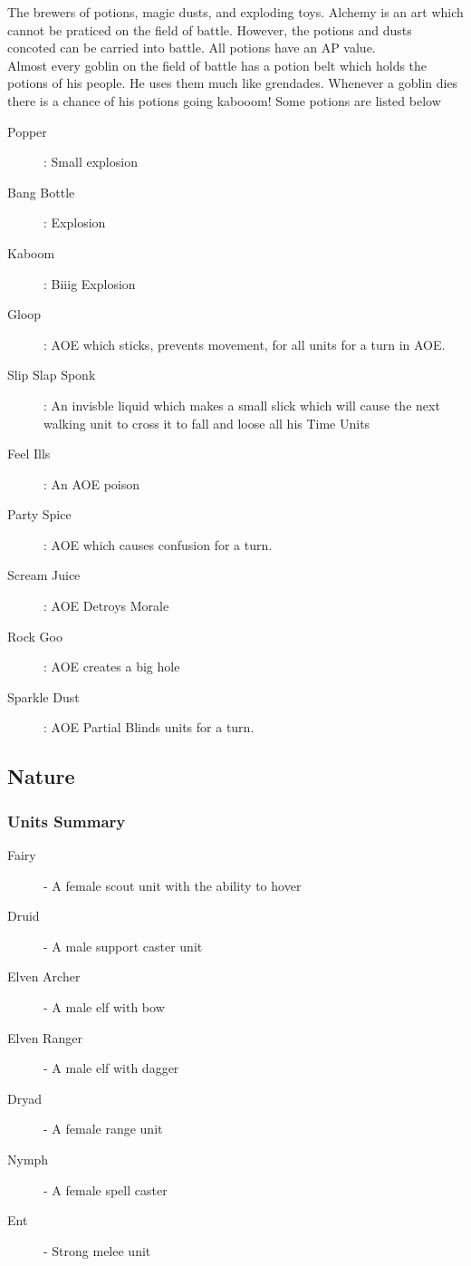 \documentclass[a4paper]{article}
\begin{document}
The brewers of potions, magic dusts, and exploding toys. Alchemy is an art which cannot be praticed on the field of battle. However, the potions and dusts concoted can be carried into battle. All potions have an AP value.\\
Almost every goblin on the field of battle has a potion belt which holds the potions of his people. He uses them much like grendades. Whenever a goblin dies there is a chance of his potions going kabooom! Some potions are listed below
\begin{description}
\item[Popper]: Small explosion
\item[Bang Bottle]: Explosion
\item[Kaboom]: Biiig Explosion
\item[Gloop]: AOE which sticks, prevents movement, for all units for a turn in AOE.
\item[Slip Slap Sponk]: An invisble liquid which makes a small slick which will cause the next walking unit to cross it to fall and loose all his Time Units
\item[Feel Ills]: An AOE poison
\item[Party Spice]: AOE which causes confusion for a turn.
\item[Scream Juice]: AOE Detroys Morale
\item[Rock Goo]: AOE creates a big hole
\item[Sparkle Dust]: AOE Partial Blinds units for a turn.
\end{description}
 
\subsection{Nature}

\subsubsection{Units Summary}
\begin{description}
\item[Fairy] - A female scout unit with the ability to hover
\item[Druid] - A male support caster unit

\item[Elven Archer] - A male elf with bow

\item[Elven Ranger] - A male elf with dagger
\item[Dryad] - A female range unit 

\item[Nymph] - A female spell caster
\item[Ent] - Strong melee unit
\end{description}
\end{document}
